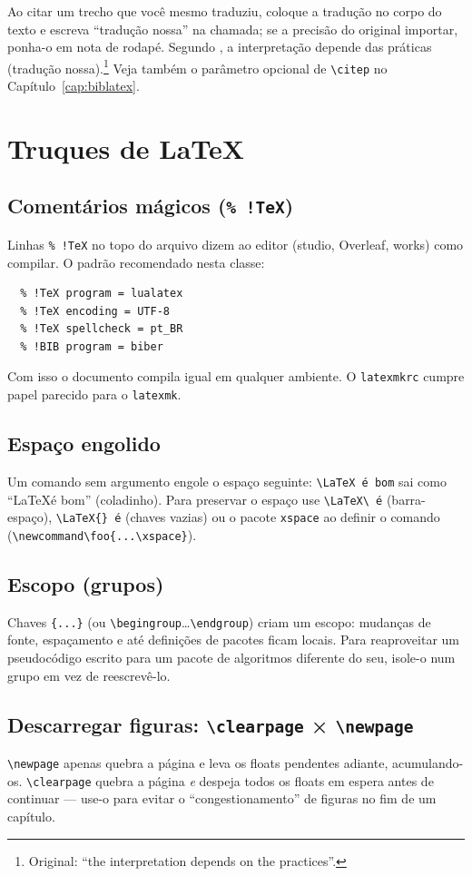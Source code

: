 \documentclass[dsc,pdfa]{coppe}
\begin{document}
  Ao citar um trecho que você mesmo traduziu, coloque a tradução no corpo do texto e escreva ``tradução nossa'' na chamada; se a precisão do original importar, ponha-o em nota de rodapé. Segundo \citet[p.~45]{article-example}, a interpretação depende das práticas (tradução nossa).\footnote{Original: ``the interpretation depends on the practices''.} Veja também o parâmetro opcional de \verb|\citep| no Capítulo~\ref{cap:biblatex}.

  \chapter{Truques de \LaTeX}

  \section{Comentários mágicos (\texttt{\% !TeX})}
  Linhas \verb|% !TeX| no topo do arquivo dizem ao editor (studio, Overleaf, works) como compilar. O padrão recomendado nesta classe:
  \begin{verbatim}
  % !TeX program = lualatex
  % !TeX encoding = UTF-8
  % !TeX spellcheck = pt_BR
  % !BIB program = biber
  \end{verbatim}
  Com isso o documento compila igual em qualquer ambiente. O \texttt{latexmkrc} cumpre papel parecido para o \verb|latexmk|.

  \section{Espaço engolido}
  Um comando sem argumento engole o espaço seguinte: \verb|\LaTeX é bom| sai como ``\LaTeX é bom'' (coladinho). Para preservar o espaço use \verb|\LaTeX\ é| (barra-espaço), \verb|\LaTeX{} é| (chaves vazias) ou o pacote \verb|xspace| ao definir o comando (\verb|\newcommand\foo{...\xspace}|).

  \section{Escopo (grupos)}
  Chaves \verb|{...}| (ou \verb|\begingroup|\dots\verb|\endgroup|) criam um escopo: mudanças de fonte, espaçamento e até definições de pacotes ficam locais. Para reaproveitar um pseudocódigo escrito para um pacote de algoritmos diferente do seu, isole-o num grupo em vez de reescrevê-lo.

  \section{Descarregar figuras: \texttt{\textbackslash clearpage} × \texttt{\textbackslash newpage}}
  \verb|\newpage| apenas quebra a página e leva os floats pendentes adiante, acumulando-os. \verb|\clearpage| quebra a página \emph{e} despeja todos os floats em espera antes de continuar --- use-o para evitar o ``congestionamento'' de figuras no fim de um capítulo.
\end{document}
